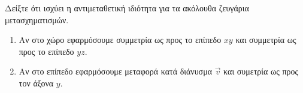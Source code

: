 \begin{exercise}
	Δείξτε ότι ισχύει η αντιμεταθετική ιδιότητα για τα ακόλουθα ζευγάρια μετασχηματισμών.
	\begin{enumerate}
		\item Αν στο χώρο εφαρμόσουμε συμμετρία ως προς το επίπεδο $xy$ και συμμετρία ως προς το επίπεδο $yz$.
		\item Αν στο επίπεδο εφαρμόσουμε μεταφορά κατά διάνυσμα $\vec{v}$ και συμετρία ως προς τον άξονα $y$.
	\end{enumerate}
	
\end{exercise}


%

